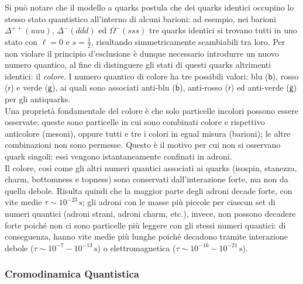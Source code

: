 Si può notare che il modello a quarks postula che dei quarks identici occupino lo stesso stato quantistico all'interno di alcuni barioni: ad esempio, nei barioni $ \Delta^{++}(uuu) $, $ \Delta^- (ddd) $ ed $ \Omega^-(sss) $ tre quarks identici si trovano tutti in uno stato con $ \ell = 0 $ e $ s = \frac{1}{2} $, risultando simmetricamente scambiabili tra loro. Per non violare il principio d'esclusione è dunque necessario introdurre un nuovo numero quantico, al fine di distinguere gli stati di questi quarks altrimenti identici: il \textit{colore}. I numero quantico di colore ha tre possibili valori: blu ($ \mathsf{b} $), rosso ($ \mathsf{r} $) e verde ($ \mathsf{g} $), ai quali sono associati anti-blu ($ \bar{\mathsf{b}} $), anti-rosso ($ \bar{\mathsf{r}} $) ed anti-verde ($ \bar{\mathsf{g}} $) per gli antiquarks.\\
Una proprietà fondamentale del colore è che solo particelle incolori possono essere osservate: queste sono particelle in cui sono combinati colore e rispettivo anticolore (mesoni), oppure tutti e tre i colori in egual misura (barioni); le altre combinazioni non sono permesse. Questo è il motivo per cui non si osservano quark singoli: essi vengono istantaneamente confinati in adroni.\\
Il colore, così come gli altri numeri quantici associati ai quarks (isospin, stanezza, charm, bottomness e topness) sono conservati dall'interazione forte, ma non da quella debole. Risulta quindi che la maggior parte degli adroni decade forte, con vite medie $ \tau \sim 10^{-23}\,\text{s} $; gli adroni con le masse più piccole per ciascun set di numeri quantici (adroni strani, adroni charm, etc.), invece, non possono decadere forte poiché non ci sono particelle più leggere con gli stessi numeri quantici: di conseguenza, hanno vite medie più lunghe poiché decadono tramite interazione debole ($ \tau \sim 10^{-7} - 10^{-13}\,\text{s} $) o elettromagnetica ($ \tau \sim 10^{-16} - 10^{-21}\,\text{s} $).

\subsubsection{Cromodinamica Quantistica}

